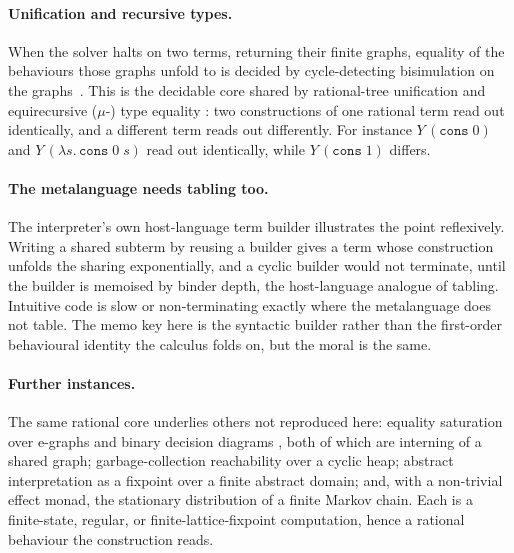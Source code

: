 \paragraph{Unification and recursive types.}
When the solver halts on two terms, returning their finite graphs, equality of the behaviours
those graphs unfold to is decided by cycle-detecting bisimulation on the
graphs~\cite{courcelle1983-infinite-trees}. This is the decidable core shared by rational-tree
unification \cite{colmerauer1984-trees} and equirecursive ($\mu$-) type equality
\cite{amadio1993-subtyping-recursive-types, brandt1998-coinductive-type-equality}: two constructions of one rational term read out
identically, and a different term reads out differently. For instance $Y\,(\mathtt{cons}\;0)$ and
$Y\,(\lambda s.\,\mathtt{cons}\;0\;s)$ read out identically, while $Y\,(\mathtt{cons}\;1)$ differs.

\paragraph{The metalanguage needs tabling too.}
The interpreter's own host-language term builder illustrates the point reflexively. Writing a shared
subterm by reusing a builder gives a term whose construction unfolds the sharing exponentially, and
a cyclic builder would not terminate, until the builder is memoised by binder depth, the
host-language analogue of tabling. Intuitive code is slow or non-terminating exactly where the
metalanguage does not table. The memo key here is the syntactic builder rather than the first-order
behavioural identity the calculus folds on, but the moral is the same.

\paragraph{Further instances.}
The same rational core underlies others not reproduced here: equality saturation over e-graphs
\cite{willsey2021-egg, zhang2023-egglog} and binary decision diagrams \cite{bryant1986-bdd}, both of which are interning
of a shared graph; garbage-collection reachability over a cyclic heap; abstract interpretation as a
fixpoint over a finite abstract domain; and, with a non-trivial effect monad, the stationary
distribution of a finite Markov chain. Each is a finite-state, regular, or finite-lattice-fixpoint
computation, hence a rational behaviour the construction reads.


